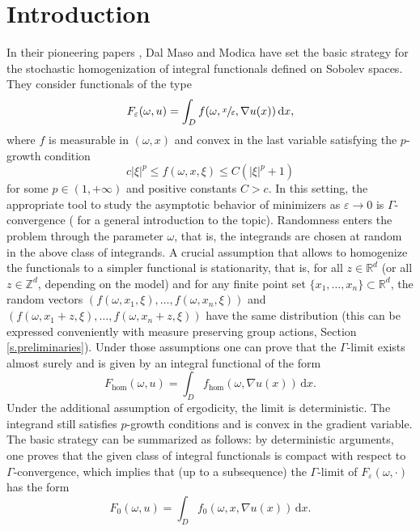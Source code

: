 \documentclass[JEP,XML,SOM,Unicode,published]{cedram}
\theoremstyle{definition}
\let\e\varepsilon
\let\w\omega
\newcommand{\dx}{\,\mathrm{d}x}
\newcommand{\R}{\mathbb{R}}
\newcommand{\Z}{\mathbb{Z}}
\begin{document}
\section{Introduction}
In their pioneering papers \cite{DMMoI,DMMoII}, Dal Maso and Modica have set the basic strategy for the stochastic homogenization of integral functionals defined on Sobolev spaces. They consider functionals of the type
\begin{equation}\label{eq:F_eps}
F_{\e}(\w,u)=\int_D f(\w,\sfrac{x}{\e},\nabla u(x))\dx,
\end{equation}
where $f$ is measurable in $(\w,x)$ and convex in the last variable satisfying the $p$-growth condition
\begin{equation}\label{eq:p-growth}
c|\xi|^p\leq f(\w,x,\xi)\leq C(|\xi|^p+1)
\end{equation}
for some $p\in (1,+\infty)$ and positive constants $C>c$. In this setting, the appropriate tool to study the asymptotic behavior of minimizers as $\e\to 0$ is $\Gamma$-convergence (\cf \cite{Br,DM} for a general introduction to the topic). Randomness enters the problem through the parameter $\w$, that is, the integrands are chosen at random in the above class of integrands. A crucial assumption that allows to homogenize the functionals to a simpler functional is stationarity, that is, for all $z\in\R^d$ (or all $z\in\Z^d$, depending on the model) and for any finite point set $\{x_1,\ldots,x_n\}\subset\R^d$, the random vectors $(f(\w,x_1,\xi),\ldots,f(\w,x_n,\xi))$ and $(f(\w,x_1+z,\xi),\ldots,f(\w,x_n+z,\xi))$ have the same distribution (this can be expressed conveniently with measure preserving group actions, \cf Section \ref{s.preliminaries}). Under those assumptions one can prove that the $\Gamma$-limit exists almost surely and is given by an integral functional of the form
\begin{equation*}
F_{\hom}(\w,u)=\int_D f_{\hom}(\w,\nabla u(x))\dx.
\end{equation*}
Under the additional assumption of ergodicity, the limit is deterministic. The integrand still satisfies $p$-growth conditions and is convex in the gradient variable. The basic strategy can be summarized as follows: by deterministic arguments, one proves that the given class of integral functionals is compact with respect to $\Gamma$-convergence, which implies that (up to a subsequence) the $\Gamma$-limit of $F_{\e}(\w,\cdot)$ has the form
\begin{equation*}
F_{0}(\w,u)=\int_D f_0(\w,x,\nabla u(x))\dx.
\end{equation*}
\end{document}
